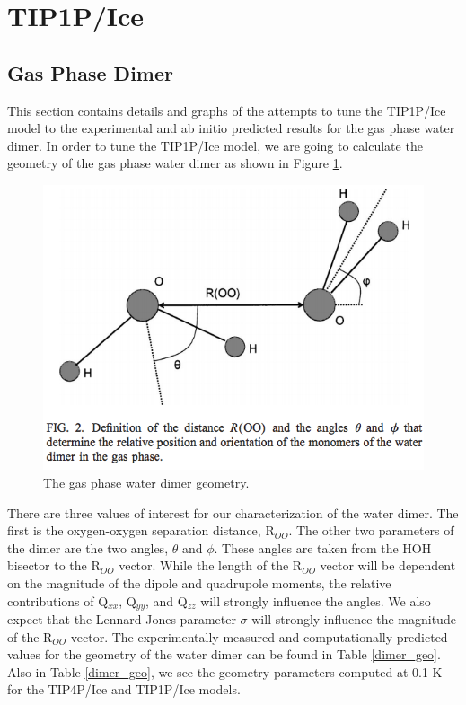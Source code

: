 \section{TIP1P/Ice}
\subsection{Gas Phase Dimer}
This section contains details and graphs of the attempts to tune the TIP1P/Ice
model to the experimental and ab initio predicted results for the gas phase
water dimer. In order to tune the TIP1P/Ice model, we are going to calculate 
the geometry of the gas phase water dimer as shown in Figure 
\ref{fig:dimer}\cite{Yu2004}.

\begin{figure}[h!]
\includegraphics[width = \linewidth]{Figures/dimer.pdf}
\caption{\label{fig:dimer} The gas phase water dimer geometry.}
\end{figure}

There are three values of interest for our characterization of the water dimer.
The first is the oxygen-oxygen separation distance, R$_{OO}$. The other two
parameters of the dimer are the two angles, $\theta$ and $\phi$. These angles
are taken from the HOH bisector to the R$_{OO}$ vector. While the length
of the R$_{OO}$ vector will be dependent on the magnitude of the dipole and 
quadrupole moments, the relative contributions of Q$_{xx}$, Q$_{yy}$, and
Q$_{zz}$ will strongly influence the angles. We also expect that the 
Lennard-Jones parameter $\sigma$ will strongly influence the magnitude of
the R$_{OO}$ vector.
The experimentally measured and computationally predicted values for the 
geometry of the water
dimer can be found in Table \ref{dimer_geo}. Also in Table \ref{dimer_geo}, we
see the geometry parameters computed at 0.1 K for the TIP4P/Ice and TIP1P/Ice
models.

